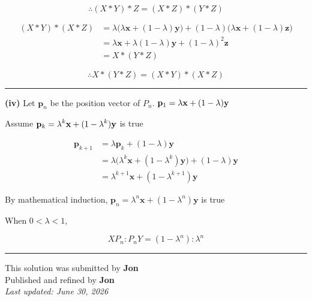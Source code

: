 \documentclass[12pt]{article}
\begin{document}
$$\therefore (X*Y)*Z=(X*Z)*(Y*Z)$$

\begin{align*}
(X*Y)*(X*Z)
&=\lambda\bigl(\lambda\mathbf{x}+(1-\lambda)\mathbf{y}\bigr)
+(1-\lambda)\bigl(\lambda\mathbf{x}+(1-\lambda)\mathbf{z}\bigr)\\
&=\lambda\mathbf{x}+\lambda(1-\lambda)\mathbf{y}+(1-\lambda)^2\mathbf{z}\\
&=X*(Y*Z)
\end{align*}

$$\therefore X*(Y*Z)=(X*Y)*(X*Z)$$

\bigskip\hrule\bigskip

\textbf{(iv)} Let $\mathbf{p}_n$ be the position vector of $P_n$. $\displaystyle \mathbf{p}_1=\lambda\mathbf{x}+(1-\lambda)\mathbf{y}$

Assume $\displaystyle \mathbf{p}_k=\lambda^k\mathbf{x}+(1-\lambda^k)\mathbf{y}$ is true

\begin{align*}
\mathbf{p}_{k+1}
&=\lambda\mathbf{p}_k+(1-\lambda)\mathbf{y}\\
&=\lambda\bigl(\lambda^k\mathbf{x}+(1-\lambda^k)\mathbf{y}\bigr)+(1-\lambda)\mathbf{y}\\
&=\lambda^{k+1}\mathbf{x}+(1-\lambda^{k+1})\mathbf{y}
\end{align*}

By mathematical induction, $\mathbf{p}_n=\lambda^n\mathbf{x}+(1-\lambda^n)\mathbf{y}$ is true

When $0<\lambda<1$,

$$XP_n:P_nY=(1-\lambda^n):\lambda^n$$

\bigskip
\hrule
\begin{center}
    This solution was submitted by \textbf{Jon}\\[4pt]
    Published and refined by \textbf{Jon}\\[8pt]
    \textit{Last updated: June 30, 2026}
\end{center}
\end{document}
